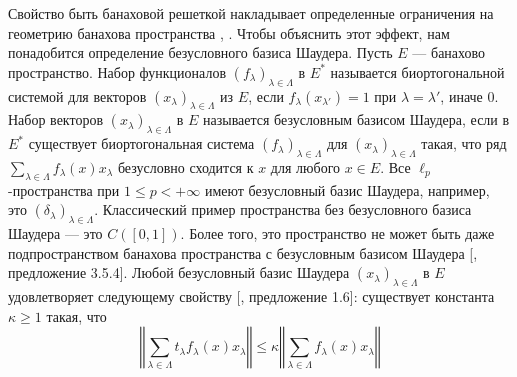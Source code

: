 Свойство быть банаховой решеткой накладывает определенные ограничения на геометрию банахова пространства \cite{SherOrderInOpAlg}, \cite{KadOrderPropOfBoundSAOps}. Чтобы объяснить этот эффект, нам понадобится определение безусловного базиса Шаудера. Пусть $E$ --- банахово пространство. Набор функционалов $(f_\lambda)_{\lambda\in\Lambda}$ в $E^*$ называется биортогональной системой для векторов $(x_\lambda)_{\lambda\in\Lambda}$ из $E$, если $f_\lambda(x_{\lambda'})=1$ при $\lambda=\lambda'$, иначе $0$. Набор векторов $(x_\lambda)_{\lambda\in\Lambda}$ в $E$ называется безусловным базисом Шаудера, если в $E^*$ существует биортогональная система $(f_\lambda)_{\lambda\in\Lambda}$ для $(x_\lambda)_{\lambda\in\Lambda}$ такая, что
ряд $\sum_{\lambda\in\Lambda} f_\lambda(x)x_\lambda$ безусловно сходится к $x$ для любого $x\in E$. Все $\ell_p$-пространства при $1\leq p<+\infty$ имеют безусловный базис Шаудера, например, это $(\delta_\lambda)_{\lambda\in\Lambda}$. Классический пример пространства без безусловного базиса Шаудера --- это $C([0,1])$. Более того, это пространство не может быть даже подпространством банахова пространства с безусловным базисом Шаудера [\cite{KalAlbTopicsBanSpTh}, предложение 3.5.4]. Любой безусловный базис Шаудера $(x_\lambda)_{\lambda\in\Lambda}$ в $E$ удовлетворяет следующему свойству [\cite{DiestAbsSumOps}, предложение 1.6]: существует константа $\kappa\geq 1$ такая, что
$$
\left\Vert \sum_{\lambda\in\Lambda}t_\lambda f_\lambda(x)x_\lambda\right\Vert
\leq
\kappa\left\Vert \sum_{\lambda\in\Lambda}f_\lambda(x)x_\lambda\right\Vert
$$
